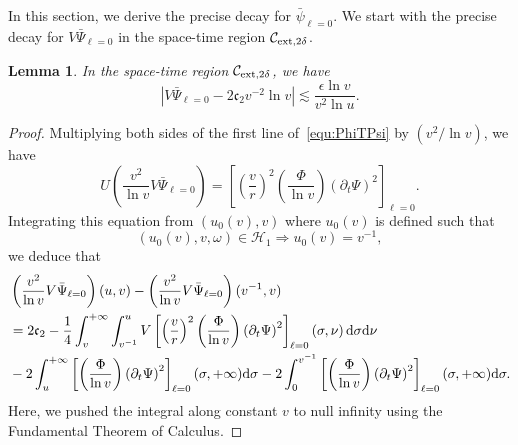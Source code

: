 \documentclass[a4paper,reqno]{amsart}
\newtheorem{lemma}[theorem]{Lemma}
\theoremstyle{definition}
\numberwithin{equation}{section}
\def \d {{\rm{d}}}
\def \pt{\partial_{t}}
\def\ep{\epsilon}
\begin{document}

In this section, we derive the precise decay for $\bar{\psi}_{\ell=0}$. 
We start with the precise decay for $V\bar{\Psi}_{\ell=0}$ in the space-time region $\mathcal{C}_{\rm{ext},2\delta}$. 

\begin{lemma}\label{le:VPsi}
In the space-time region $\mathcal{C}_{\rm{ext},2\delta}$, we have 
\begin{equation}\label{est:VPsi}
\left|V\bar{\Psi}_{\ell=0}-
2\mathfrak{c}_{2}v^{-2}\ln v\right|\lesssim 
\frac{\ep \ln v}{v^{2}\ln u}.
\end{equation}
\end{lemma}

\begin{proof}
Multiplying both sides of the first line of~\eqref{equ:PhiTPsi} by $(v^{2}/\ln v)$, we have 
\begin{equation*}
U\left(\frac{v^{2}}{\ln v}V\bar{\Psi}_{\ell=0}\right)=\left[\left(\frac{v}{r}\right)^{2}\left(\frac{\Phi}{\ln v}\right)\left(\pt \Psi\right)^{2}\right]_{\ell=0}.
\end{equation*}
Integrating this equation from $(u_{0}(v),v)$ where $u_{0}(v)$ is defined such that 
\begin{equation*}
    (u_{0}(v),v,\omega)\in \mathcal{H}_{1}\Longrightarrow u_{0}(v)=v^{-1},
\end{equation*}
we deduce that
\begin{equation*}
\begin{aligned}
&\left(\frac{v^{2}}{\ln v}V\bar{\Psi}_{\ell=0}\right)(u,v)-\left(\frac{v^{2}}{\ln v}V\bar{\Psi}_{\ell=0}\right)(v^{-1},v)\\
&=2\mathfrak{c}_{2}-\frac{1}{4}\int_{v}^{+\infty}\int_{v^{-1}}^{u}V\left[\left(\frac{v}{r}\right)^{2}\left(\frac{\Phi}{\ln v}\right)\left(\pt \Psi\right)^{2}\right]_{\ell=0}\left(\sigma,\nu\right)\d \sigma \d \nu\\
&-2\int_{u}^{+\infty}\left[\left(\frac{\Phi}{\ln v}\right)\left(\pt \Psi\right)^{2}\right]_{\ell=0}(\sigma,+\infty)\d \sigma-
2\int_{0}^{v^{-1}}\left[\left(\frac{\Phi}{\ln v}\right)\left(\pt \Psi\right)^{2}\right]_{\ell=0}(\sigma,+\infty)\d \sigma.
\end{aligned}
\end{equation*}
Here, we pushed the integral along constant $v$ to null infinity using the Fundamental Theorem of Calculus.


\end{proof}
\end{document}
